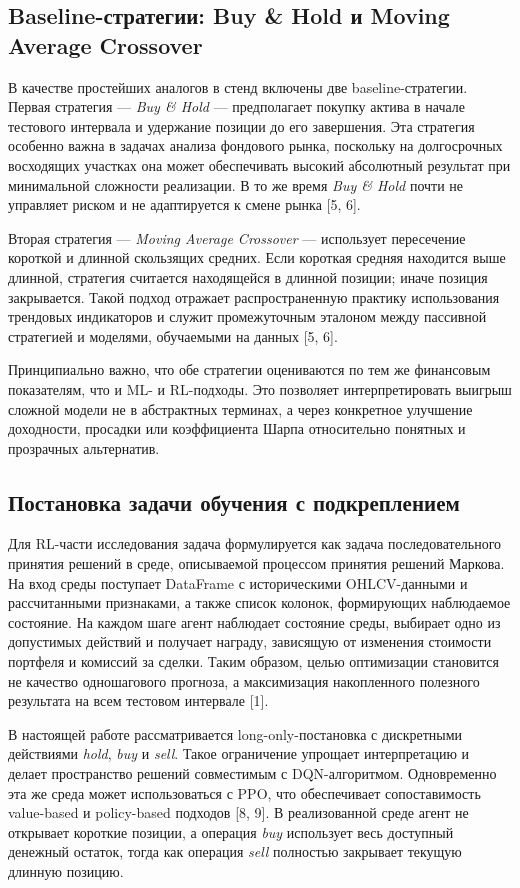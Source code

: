 \subsection{Baseline-стратегии: Buy \& Hold и Moving Average Crossover}

В качестве простейших аналогов в стенд включены две baseline-стратегии. Первая стратегия — \textit{Buy \& Hold} — предполагает покупку актива в начале тестового интервала и удержание позиции до его завершения. Эта стратегия особенно важна в задачах анализа фондового рынка, поскольку на долгосрочных восходящих участках она может обеспечивать высокий абсолютный результат при минимальной сложности реализации. В то же время \textit{Buy \& Hold} почти не управляет риском и не адаптируется к смене рынка [5, 6].

Вторая стратегия — \textit{Moving Average Crossover} — использует пересечение короткой и длинной скользящих средних. Если короткая средняя находится выше длинной, стратегия считается находящейся в длинной позиции; иначе позиция закрывается. Такой подход отражает распространенную практику использования трендовых индикаторов и служит промежуточным эталоном между пассивной стратегией и моделями, обучаемыми на данных [5, 6].

Принципиально важно, что обе стратегии оцениваются по тем же финансовым показателям, что и ML- и RL-подходы. Это позволяет интерпретировать выигрыш сложной модели не в абстрактных терминах, а через конкретное улучшение доходности, просадки или коэффициента Шарпа относительно понятных и прозрачных альтернатив.

\subsection{Постановка задачи обучения с подкреплением}

Для RL-части исследования задача формулируется как задача последовательного принятия решений в среде, описываемой процессом принятия решений Маркова. На вход среды поступает DataFrame с историческими OHLCV-данными и рассчитанными признаками, а также список колонок, формирующих наблюдаемое состояние. На каждом шаге агент наблюдает состояние среды, выбирает одно из допустимых действий и получает награду, зависящую от изменения стоимости портфеля и комиссий за сделки. Таким образом, целью оптимизации становится не качество одношагового прогноза, а максимизация накопленного полезного результата на всем тестовом интервале [1].

В настоящей работе рассматривается long-only-постановка с дискретными действиями \textit{hold}, \textit{buy} и \textit{sell}. Такое ограничение упрощает интерпретацию и делает пространство решений совместимым с DQN-алгоритмом. Одновременно эта же среда может использоваться с PPO, что обеспечивает сопоставимость value-based и policy-based подходов [8, 9]. В реализованной среде агент не открывает короткие позиции, а операция \textit{buy} использует весь доступный денежный остаток, тогда как операция \textit{sell} полностью закрывает текущую длинную позицию.

